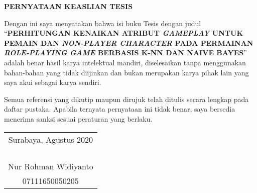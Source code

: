 \begin{center}
\large\textbf{PERNYATAAN KEASLIAN TESIS}
\end{center}
\vspace{1ex}
\begin{spacing}{1.5}

\setlength{\parindent}{0.9cm} Dengan ini saya menyatakan bahwa isi buku Tesis dengan judul ``\textbf{PERHITUNGAN KENAIKAN ATRIBUT \textit{GAMEPLAY} UNTUK PEMAIN DAN \textit{NON-PLAYER CHARACTER} PADA PERMAINAN \textit{ROLE-PLAYING GAME} BERBASIS K-NN DAN NAIVE BAYES}'' adalah benar hasil karya intelektual mandiri, diselesaikan tanpa menggunakan bahan-bahan yang tidak diijinkan dan bukan merupakan karya pihak lain yang saya akui sebagai karya sendiri.
\vspace{1ex}

Semua referensi yang dikutip maupun dirujuk telah ditulis secara lengkap pada daftar pustaka. Apabila ternyata pernyataan ini tidak benar, saya bersedia menerima sanksi sesuai peraturan yang berlaku.
\vspace{1ex}
\end{spacing}
\begin{flushright}
\begin{tabular}[b]{c}
  Surabaya, Agustus 2020\\
  \\
  \\
  \\
  \\
  Nur Rohman Widiyanto\\
  07111650050205
\end{tabular}
\end{flushright}
